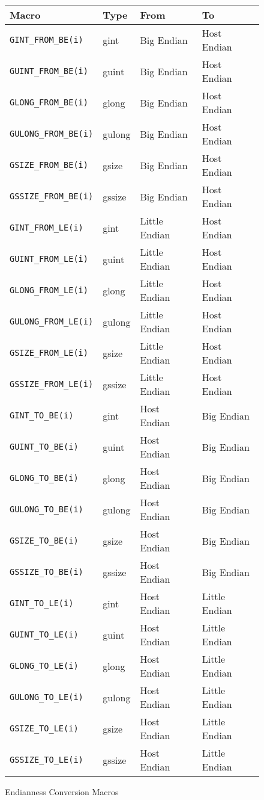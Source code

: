 \begin{figure}[h!]
\centering
\begin{tabular}{l | l | l | l}
Macro & Type & From & To \\
\hline
\verb|GINT_FROM_BE(i)| & gint & Big Endian & Host Endian \\
\verb|GUINT_FROM_BE(i)| & guint & Big Endian & Host Endian \\
\verb|GLONG_FROM_BE(i)| & glong & Big Endian & Host Endian \\
\verb|GULONG_FROM_BE(i)| & gulong & Big Endian & Host Endian \\
\verb|GSIZE_FROM_BE(i)| & gsize & Big Endian & Host Endian \\
\verb|GSSIZE_FROM_BE(i)| & gssize & Big Endian & Host Endian \\
\verb|GINT_FROM_LE(i)| & gint & Little Endian & Host Endian \\
\verb|GUINT_FROM_LE(i)| & guint & Little Endian & Host Endian \\
\verb|GLONG_FROM_LE(i)| & glong & Little Endian & Host Endian \\
\verb|GULONG_FROM_LE(i)| & gulong & Little Endian & Host Endian \\
\verb|GSIZE_FROM_LE(i)| & gsize & Little Endian & Host Endian \\
\verb|GSSIZE_FROM_LE(i)| & gssize & Little Endian & Host Endian \\
\verb|GINT_TO_BE(i)| & gint & Host Endian & Big Endian \\
\verb|GUINT_TO_BE(i)| & guint & Host Endian & Big Endian \\
\verb|GLONG_TO_BE(i)| & glong & Host Endian & Big Endian \\
\verb|GULONG_TO_BE(i)| & gulong & Host Endian & Big Endian \\
\verb|GSIZE_TO_BE(i)| & gsize & Host Endian & Big Endian \\
\verb|GSSIZE_TO_BE(i)| & gssize & Host Endian & Big Endian \\
\verb|GINT_TO_LE(i)| & gint & Host Endian & Little Endian \\
\verb|GUINT_TO_LE(i)| & guint & Host Endian & Little Endian \\
\verb|GLONG_TO_LE(i)| & glong & Host Endian & Little Endian \\
\verb|GULONG_TO_LE(i)| & gulong & Host Endian & Little Endian \\
\verb|GSIZE_TO_LE(i)| & gsize & Host Endian & Little Endian \\
\verb|GSSIZE_TO_LE(i)| & gssize & Host Endian & Little Endian \\
\end{tabular}
\label{fig:endianness}
\caption{Endianness Conversion Macros}
\end{figure}


